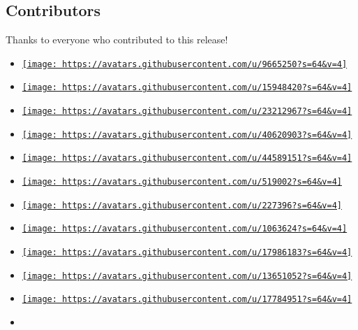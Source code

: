 \subsection{Contributors}\label{contributors}

Thanks to everyone who contributed to this release!

\begin{itemize}
\tightlist
\item
  \href{https://github.com/Dherse}{\texttt{[image: https://avatars.githubusercontent.com/u/9665250?s=64\&v=4]}}
\item
  \href{https://github.com/barvirm}{\texttt{[image: https://avatars.githubusercontent.com/u/15948420?s=64\&v=4]}}
\item
  \href{https://github.com/HarmoGlace}{\texttt{[image: https://avatars.githubusercontent.com/u/23212967?s=64\&v=4]}}
\item
  \href{https://github.com/figsoda}{\texttt{[image: https://avatars.githubusercontent.com/u/40620903?s=64\&v=4]}}
\item
  \href{https://github.com/frozolotl}{\texttt{[image: https://avatars.githubusercontent.com/u/44589151?s=64\&v=4]}}
\item
  \href{https://github.com/johannes-wolf}{\texttt{[image: https://avatars.githubusercontent.com/u/519002?s=64\&v=4]}}
\item
  \href{https://github.com/naim94a}{\texttt{[image: https://avatars.githubusercontent.com/u/227396?s=64\&v=4]}}
\item
  \href{https://github.com/CGMossa}{\texttt{[image: https://avatars.githubusercontent.com/u/1063624?s=64\&v=4]}}
\item
  \href{https://github.com/FilipAndersson245}{\texttt{[image: https://avatars.githubusercontent.com/u/17986183?s=64\&v=4]}}
\item
  \href{https://github.com/GabrielDertoni}{\texttt{[image: https://avatars.githubusercontent.com/u/13651052?s=64\&v=4]}}
\item
  \href{https://github.com/P-Andersson}{\texttt{[image: https://avatars.githubusercontent.com/u/17784951?s=64\&v=4]}}
\item

\end{itemize}

